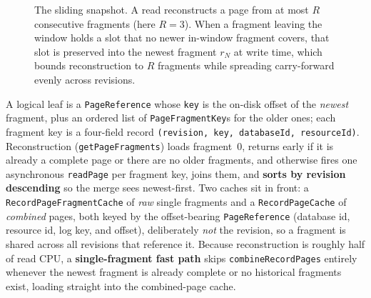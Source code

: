 \documentclass[11pt,a4paper,oneside]{report}
\theoremstyle{sirixthm}
\newcommand{\code}[1]{\texttt{#1}}
\begin{document}
\begin{figure}[t]
\centering
{}
\caption{The sliding snapshot. A read reconstructs a page from at most $R$ consecutive fragments
(here $R=3$). When a fragment leaving the window holds a slot that no newer in-window fragment
covers, that slot is preserved into the newest fragment $r_N$ at write time, which bounds
reconstruction to $R$ fragments while spreading carry-forward evenly across revisions.}
\label{fig:slide}
\end{figure}

A logical leaf is a \code{PageReference} whose \code{key} is the on-disk offset of the \emph{newest}
fragment, plus an ordered list of \code{PageFragmentKey}s for the older ones; each fragment key is a
four-field record \code{(revision, key, databaseId, resourceId)}. Reconstruction
(\code{getPageFragments}) loads fragment~0, returns early if it is already a complete page or there
are no older fragments, and otherwise fires one asynchronous \code{readPage} per fragment key, joins
them, and \textbf{sorts by revision descending} so the merge sees newest-first. Two caches sit in
front: a \code{RecordPageFragmentCache} of \emph{raw} single fragments and a \code{RecordPageCache} of
\emph{combined} pages, both keyed by the offset-bearing \code{PageReference} (database id, resource
id, log key, and offset), deliberately \emph{not} the revision, so a fragment is shared across all
revisions that reference it. Because reconstruction is roughly half of read CPU, a
\textbf{single-fragment fast path} skips \code{combineRecordPages} entirely whenever the newest
fragment is already complete or no historical fragments exist, loading straight into the
combined-page cache.
\end{document}
